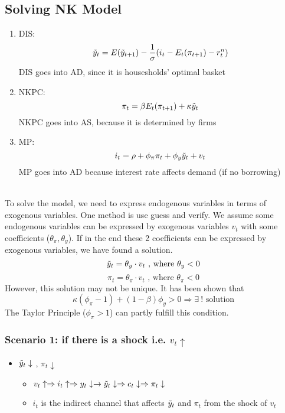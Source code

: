 \documentclass{article}
\begin{document}
\subsection{Solving NK Model}
\begin{enumerate}
    \item DIS: 
$$\Tilde{y}_t = E(\Tilde{y}_{t+1}) - \frac{1}{\sigma}(i_t - E_t(\pi_{t+1}) - r_t^n)$$
DIS goes into AD, since it is housesholds' optimal basket
    \item NKPC:
$$\pi_t = \beta E_t(\pi_{t+1}) + \kappa \Tilde{y}_t$$
NKPC goes into AS, because it is determined by firms
    \item MP:
$$i_t = \rho + \phi_\pi \pi_t + \phi_y \Tilde{y}_t + v_t$$
MP goes into AD because interest rate affects demand (if no borrowing)
\end{enumerate}
\\
To solve the model, we need to express endogenous variables in terms of exogenous variables. One method is use guess and verify. We assume some endogenous variables can be expressed by exogenous variables $v_t$ with some coefficients ($\theta_\pi,\theta_y$). If in the end these 2 coefficients can be expressed by exogenous variables, we have found a solution. 
$$\Tilde{y}_t = \theta_y \cdot v_t \text{ , where }\theta_y < 0$$
$$\pi_t = \theta_\pi \cdot v_t \text{ , where }\theta_\pi < 0$$
However, this solution may not be unique. It has been shown that 
$$\kappa (\phi_\pi - 1) + (1-\beta)\phi_y > 0 \Rightarrow \exists\ ! \text{ solution}$$
The Taylor Principle ($\phi_\pi > 1$) can partly fulfill this condition.

\subsubsection{Scenario 1: if there is a shock i.e. $v_t\uparrow$}
\begin{itemize}
    \item $\Tilde{y}_t \downarrow$ , $\pi_t \downarrow$
    \begin{itemize}
        \item $v_t\uparrow \Rightarrow i_t \uparrow \Rightarrow y_t\downarrow \rightarrow \Tilde{y}_t\downarrow \Rightarrow c_t\downarrow \Rightarrow \pi_t \downarrow$
        \item $i_t$ is the indirect channel that affects $\Tilde{y}_t$ and $\pi_t$ from the shock of $v_t$
    \end{itemize}
\end{itemize}
\end{document}
